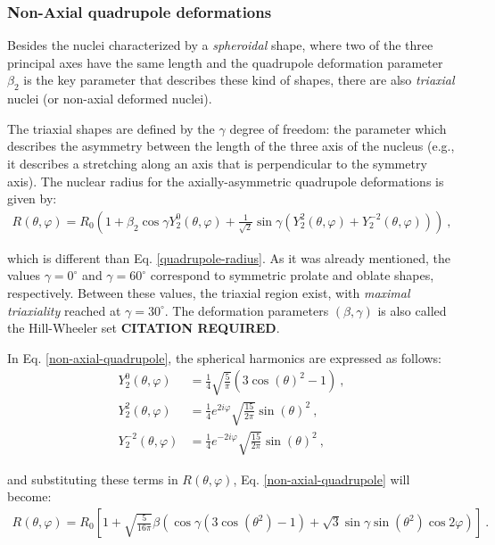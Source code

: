 \subsubsection{Non-Axial quadrupole deformations}

Besides the nuclei characterized by a \emph{spheroidal} shape, where two of the three principal axes have the same length and the quadrupole deformation parameter $\beta_2$ is the key parameter that describes these kind of shapes, there are also \emph{triaxial} nuclei (or non-axial deformed nuclei).

The triaxial shapes are defined by the $\gamma$ degree of freedom: the parameter which describes the asymmetry between the length of the three axis of the nucleus (e.g., it describes a stretching along an axis that is perpendicular to the symmetry axis). The nuclear radius for the axially-asymmetric quadrupole deformations is given by:
\begin{align}
    R(\theta,\varphi)=R_0\left(1+\beta_2\cos\gamma Y_2^0(\theta,\varphi)+\frac{1}{\sqrt{2}}\sin\gamma(Y_2^2(\theta,\varphi)+Y_2^{-2}(\theta,\varphi))\right)\ ,
    \label{non-axial-quadrupole}
\end{align}

which is different than Eq. \ref{quadrupole-radius}. As it was already mentioned, the values $\gamma=0^\circ$ and $\gamma=60^\circ$ correspond to symmetric prolate and oblate shapes, respectively. Between these values, the triaxial region exist, with \emph{maximal triaxiality} reached at $\gamma=30^\circ$. The deformation parameters $(\beta,\gamma)$ is also called the Hill-Wheeler set \textbf{CITATION REQUIRED}.

In Eq. \ref{non-axial-quadrupole}, the spherical harmonics are expressed as follows:
\begin{align}
    Y_2^0(\theta,\varphi)&=\frac{1}{4}\sqrt{\frac{5}{\pi}}\left(3\cos(\theta)^2-1\right)\ , \nonumber\\
    Y_2^2(\theta,\varphi)&=\frac{1}{4}e^{2i\varphi}\sqrt{\frac{15}{2\pi}}\sin(\theta)^2\ ,\nonumber\\
    Y_2^{-2}(\theta,\varphi)&=\frac{1}{4}e^{-2i\varphi}\sqrt{\frac{15}{2\pi}}\sin(\theta)^2\ ,
\end{align}

and substituting these terms in $R(\theta,\varphi)$, Eq. \ref{non-axial-quadrupole} will become:
\begin{align}
    R(\theta,\varphi)=R_0\left[1+\sqrt{\frac{5}{16\pi}}\beta\left(\cos\gamma(3\cos(\theta^2)-1)+\sqrt{3}\sin\gamma\sin(\theta^2)\cos2\varphi\right)\right]\ .
\end{align}

